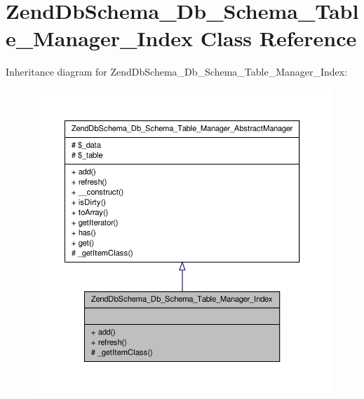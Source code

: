 \hypertarget{classZendDbSchema__Db__Schema__Table__Manager__Index}{\section{\-Zend\-Db\-Schema\-\_\-\-Db\-\_\-\-Schema\-\_\-\-Table\-\_\-\-Manager\-\_\-\-Index \-Class \-Reference}
\label{classZendDbSchema__Db__Schema__Table__Manager__Index}
}


\-Inheritance diagram for \-Zend\-Db\-Schema\-\_\-\-Db\-\_\-\-Schema\-\_\-\-Table\-\_\-\-Manager\-\_\-\-Index\-:\nopagebreak
\begin{figure}[H]
\begin{center}
\leavevmode
\includegraphics[width=350pt]{classZendDbSchema__Db__Schema__Table__Manager__Index__inherit__graph}
\end{center}
\end{figure}


